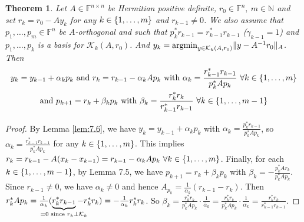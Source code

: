 \documentclass[12pt]{article}
\newcounter{lecture}
\newtheorem{theorem}{Theorem}[lecture]
\theoremstyle{definition}
\theoremstyle{remark}
\numberwithin{equation}{section}
\newcommand{\F}{\mathbb{F}}
\newcommand{\N}{\mathbb{N}}
\newcommand{\K}{\mathcal{K}}
\DeclarePairedDelimiter{\norm}{\lVert}{\rVert}
\DeclarePairedDelimiter{\set}{\{}{\}}
\DeclareMathOperator{\argmin}{argmin}
\begin{document}
\begin{theorem}
  Let $A \in \F^{n\times n}$ be Hermitian positive definite, $r_0 \in \F^n,\ m \in \N$ and set $r_k = r_0 - A y_k$ for any $k \in \set{1,\ldots, m}$ and $r_{k-1} \neq 0$. We also assume that $p_1,\ldots, p_m \in  \F^n$ be $A$-orthogonal and such that $p_k^* r_{k-1} = r_{k-1}^* r_{k-1}$ ($\gamma_{k-1} = 1$) and $p_1, \ldots, p_k$ is a basis for $\K_k(A,r_0)$. And $y_k = \argmin_{y \in \K_k(A,r_0)} \norm{y - A^{-1} r_0}_A$. Then
  \begin{gather*}
    y_k = y_{k-1} + \alpha_k p_k \text{ and } r_k = r_{k-1} - \alpha_k A p_k \text{ with } \alpha_k = \frac{r_{k-1}^* r_{k-1}}{p_k^* A p_k}\ \forall k \in \set{1,\ldots,m}\\
    \text{and } p_{k+1} = r_k + \beta_k p_k \text{ with } \beta_k = \frac{r_k^* r_k}{r_{k-1}^* r_{k-1}}\ \forall k \in \set{1,\ldots,m-1}
  \end{gather*}
\end{theorem}
\begin{proof}
  By Lemma \ref{lem:7.6}, we have $y_k = y_{k-1} + \alpha_k p_k$ with $\alpha_k = \frac{p_k^* r_{k-1}}{p_k^* A p_k}$, so $\alpha_k = \frac{r_{k-1}^* r_{k-1}}{p_k^* A p_k}$ for any $k \in \set{1,\ldots,m}$. This implies $r_k = r_{k-1} - A (x_k - x_{k-1}) = r_{k-1} - \alpha_k A p_k \ \forall k \in \set{1,\ldots,m}$. Finally, for each $k \in \set{1,\ldots,m-1}$, by Lemma 7.5, we have $p_{k+1} = r_k + \beta_k p_k$ with $\beta_k = - \frac{p_k^* A r_k}{p_k^* A p_k}$. Since $r_{k-1} \neq 0$, we have $\alpha_k \neq 0$ and hence $A_{p_k} = \frac{1}{\alpha_k}(r_{k-1} - r_k)$. Then $r_k^* A p_k = \frac{1}{\alpha_k} (\underbrace{r_k^* r_{k-1}}_{\mathclap{=0\text{ since } r_k \perp \K_k}} - r_k^* r_k) = - \frac{1}{\alpha_k} r_k^* r_k$. So $\beta_k = \frac{r_k^* r_k}{p_k^* A p_k} \cdot \frac{1}{\overline{\alpha}_k} = \frac{r_k^*r_k}{p_k^*Ap_k} \cdot \frac{1}{\alpha_k} = \frac{r_k^* r_k}{r_{k-1}^* r_{ k-1 }}$.
\end{proof}
\end{document}
